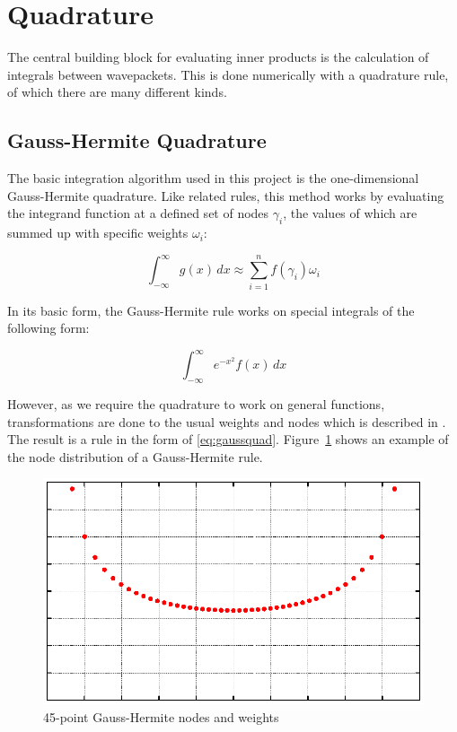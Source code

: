 \section{Quadrature}

The central building block for evaluating inner products is the calculation of
integrals between wavepackets.
This is done numerically with a quadrature rule, of which there are many
different kinds.


\subsection{Gauss-Hermite Quadrature}

The basic integration algorithm used in this project is the one-dimensional
Gauss-Hermite quadrature.
Like related rules, this method works by evaluating the integrand function at a
defined set of nodes $\gamma_i$, the values of which are summed up with specific
weights $\omega_i$:

\begin{equation}
  \label{eq:gaussquad}
  \int_{-\infty}^{\infty} g(x) \, dx \approx \sum_{i=1}^{n} f(\gamma_i) \omega_i
\end{equation}

In its basic form, the Gauss-Hermite rule works on special integrals of the
following form:

\begin{equation}
  \int_{-\infty}^{\infty} e^{-x^2} f(x) \, dx
\end{equation}

However, as we require the quadrature to work on general functions,
transformations are done to the usual weights and nodes which is described in
\cite{B_master_thesis}.
The result is a rule in the form of \eqref{eq:gaussquad}.
Figure~\ref{fig:ghexample} shows an example of the node distribution of a
Gauss-Hermite rule.

\begin{figure}
  \center
  \includegraphics[width=\linewidth]{figures/gh-rule.eps}
  \caption{45-point Gauss-Hermite nodes and weights}
  \label{fig:ghexample}
\end{figure}


